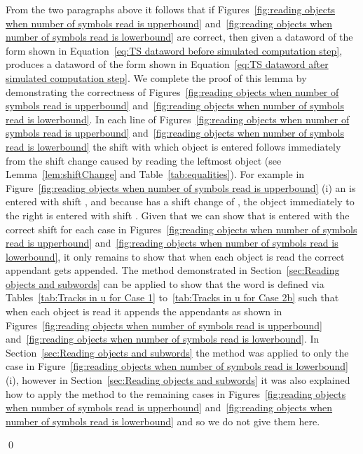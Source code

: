 \documentclass[11pt]{article} \usepackage{amsfonts,amsmath,amssymb,amsthm}
\renewenvironment{proof}{{\bfseries\noindent Proof.}}{\qed\vspace{3.5ex}}
\begin{document}
\begin{proof}
From the two paragraphs above it follows that if Figures~\ref{fig:reading objects when number of symbols read is upperbound} and~\ref{fig:reading objects when number of symbols read is lowerbound} are correct, then given a dataword of the form shown in Equation~\eqref{eq:TS dataword before simulated computation step},  produces a dataword of the form shown in Equation~\eqref{eq:TS dataword after simulated computation step}. 
We complete the proof of this lemma by demonstrating the correctness of Figures~\ref{fig:reading objects when number of symbols read is upperbound} and~\ref{fig:reading objects when number of symbols read is lowerbound}. 
In each line of Figures~\ref{fig:reading objects when number of symbols read is upperbound} and~\ref{fig:reading objects when number of symbols read is lowerbound} the shift with which object  is entered follows immediately from the shift change caused by reading the leftmost object (see Lemma~\ref{lem:shiftChange} and Table~\ref{tab:equalities}). 
For example in Figure~\ref{fig:reading objects when number of symbols read is upperbound} (i) an  is entered with shift , and because  has a shift change of , the object  immediately to the right is entered with shift .
Given that we can show that  is entered with the correct shift for each case in Figures~\ref{fig:reading objects when number of symbols read is upperbound} and~\ref{fig:reading objects when number of symbols read is lowerbound}, it only remains to show that when each object is read the correct appendant gets appended. 
The method demonstrated in Section~\ref{sec:Reading objects and  subwords} can be applied to show that the word  is defined via Tables~\ref{tab:Tracks in u for Case 1} to~\ref{tab:Tracks in u for Case 2b} such that when each object is read it appends the appendants as shown in Figures~\ref{fig:reading objects when number of symbols read is upperbound} and~\ref{fig:reading objects when number of symbols read is lowerbound}. 
In Section~\ref{sec:Reading objects and  subwords} the method was applied to only the case in Figure~\ref{fig:reading objects when number of symbols read is lowerbound} (i), however in Section~\ref{sec:Reading objects and  subwords} it was also explained how to apply the method to the remaining cases in Figures~\ref{fig:reading objects when number of symbols read is upperbound} and~\ref{fig:reading objects when number of symbols read is lowerbound} and so we do not give them here. 


\end{proof}
\end{document}
